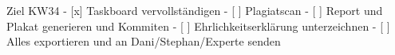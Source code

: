 Ziel KW34
- [x] Taskboard vervollständigen
- [ ] Plagiatscan 
- [ ] Report und Plakat generieren und Kommiten
- [ ] Ehrlichkeitserklärung unterzeichnen
- [ ] Alles exportieren und an Dani/Stephan/Experte senden